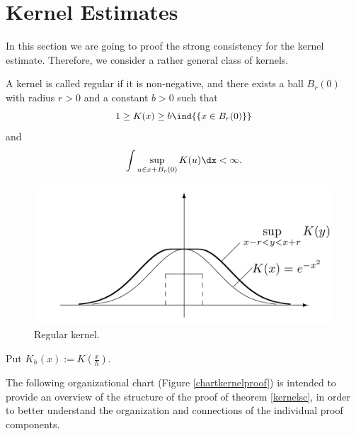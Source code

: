 \newpage


\section{Kernel Estimates} \label{kernelestimates}

In this section we are going to proof the strong consistency for the kernel estimate. Therefore, we consider a rather general class of kernels. 

\begin{definition} \label{defregularkernel}
A kernel is called regular if it is non-negative, and there exists a ball $B_r(0)$ with radius $r>0$ and a constant $b>0$ such that \[ 1 \geq K(x) \geq b \ind{\{x \in B_r(0)\}} \] and \begin{equation} \label{defregularkerneleq}
    \int \sup\limits_{u \in x+B_r(0)} K(u) \dx < \infty.
    \end{equation}
\end{definition}

\begin{figure}[h] 
    \includegraphics[scale=0.18]{regularKernelFigure.jpeg}
    \centering
    \caption{Regular kernel.} \label{figregularkernel}
\end{figure}

Put $K_h(x) := K(\frac{x}{h})$.

The following organizational chart (Figure \ref{chartkernelproof}) is intended to provide an overview of the structure of the proof of theorem \ref{kernelsc}, in order to better understand the organization and connections of the individual proof components.

